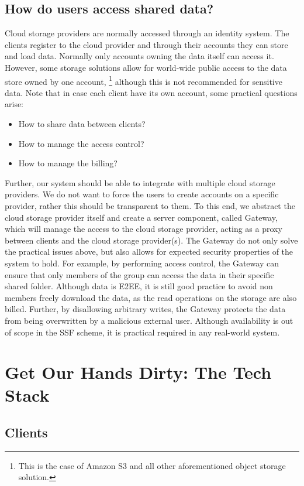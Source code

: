 \subsection{How do users access shared data?}
Cloud storage providers are normally accessed through an
identity system. The clients register to the cloud provider and
through their accounts they can store and load data.
Normally only accounts owning the data itself can access it.
However, some storage solutions allow for world-wide public access 
to the data store owned by one account,
\footnote{This is the case of Amazon S3 and all other aforementioned object storage solution.} 
although this is not recommended for sensitive data.
Note that in case each client have its own account,
some practical questions arise:
\begin{itemize}
    \item How to share data between clients?
    \item How to manage the access control?
    \item How to manage the billing?
\end{itemize}
Further, our system should be able to integrate with multiple
cloud storage providers. We do not want to force the users to
create accounts on a specific provider, rather this should be
transparent to them.
To this end, we abstract the cloud storage provider itself
and create a server component, called Gateway, which will manage
the access to the cloud storage provider, acting as a proxy
between clients and the cloud storage provider(s).
The Gateway do not only solve the practical issues above, but also
allows for expected security properties of the system to hold.
For example, by performing access control, the Gateway can ensure
that only members of the group can access the data in their
specific shared folder. Although data is E2EE, it is still
good practice to avoid non members freely download the data,
as the read operations on the storage are also billed.
Further, by disallowing arbitrary writes, the Gateway
protects the data from being overwritten by a malicious external user.
Although availability is out of scope in the SSF scheme,
it is practical required in any real-world system.

\section{Get Our Hands Dirty: The Tech Stack}

\subsection{Clients}

